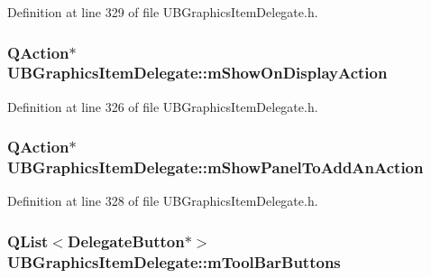Definition at line 329 of file U\-B\-Graphics\-Item\-Delegate.\-h.

\hypertarget{class_u_b_graphics_item_delegate_a9b7e283947d4119142569e0cd5d1fcdc}{
\subsubsection[{m\-Show\-On\-Display\-Action}]{\setlength{\rightskip}{0pt plus 5cm}Q\-Action$\ast$ U\-B\-Graphics\-Item\-Delegate\-::m\-Show\-On\-Display\-Action\hspace{0.3cm}{\ttfamily [protected]}}}\label{dd/dd5/class_u_b_graphics_item_delegate_a9b7e283947d4119142569e0cd5d1fcdc}


Definition at line 326 of file U\-B\-Graphics\-Item\-Delegate.\-h.

\hypertarget{class_u_b_graphics_item_delegate_a37842d928eafd9c363967046bc144f3c}{
\subsubsection[{m\-Show\-Panel\-To\-Add\-An\-Action}]{\setlength{\rightskip}{0pt plus 5cm}Q\-Action$\ast$ U\-B\-Graphics\-Item\-Delegate\-::m\-Show\-Panel\-To\-Add\-An\-Action\hspace{0.3cm}{\ttfamily [protected]}}}\label{dd/dd5/class_u_b_graphics_item_delegate_a37842d928eafd9c363967046bc144f3c}


Definition at line 328 of file U\-B\-Graphics\-Item\-Delegate.\-h.

\hypertarget{class_u_b_graphics_item_delegate_a1caf5794856eba7480eae9beeff4e2ad}{
\subsubsection[{m\-Tool\-Bar\-Buttons}]{\setlength{\rightskip}{0pt plus 5cm}Q\-List$<${\bf Delegate\-Button}$\ast$$>$ U\-B\-Graphics\-Item\-Delegate\-::m\-Tool\-Bar\-Buttons\hspace{0.3cm}{\ttfamily [protected]}}}\label{dd/dd5/class_u_b_graphics_item_delegate_a1caf5794856eba7480eae9beeff4e2ad}


